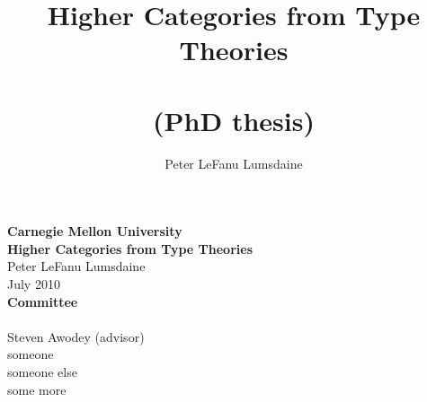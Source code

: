 \documentclass{amsbook}
\begin{document}
\frontmatter



\title{Higher Categories from Type Theories \\~\\ \normalsize (PhD thesis)}

\author[P. LeF. Lumsdaine]{Peter LeFanu Lumsdaine}


\maketitle
\newpage
\thispagestyle{empty}
\begin{center}
  {\Large\textbf{Carnegie Mellon University}}\\
  \vspace{1cm}
  {\large\textbf{Higher Categories from Type Theories}}\\
  \vspace{.5cm}
  Peter LeFanu Lumsdaine\\
  \vspace{.5cm}
  July 2010\\
  \vspace{3cm}
  \textbf{Committee}\\~\\
  Steven Awodey (advisor)\\
  someone \\
  someone else \\
  some more \\
   \\

\end{center}
 
\setcounter{page}{3}




\tableofcontents




%
%
\end{document}
